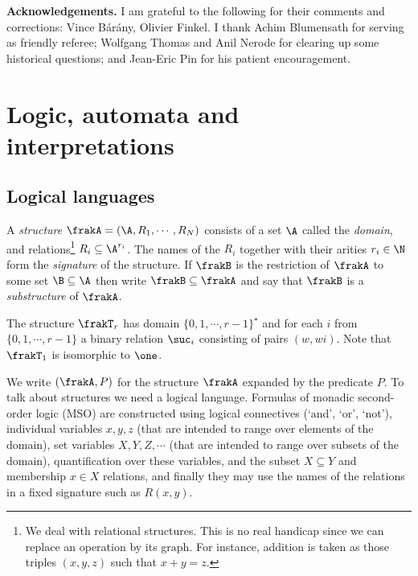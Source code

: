 

{\bf Acknowledgements.} I am grateful to the following for their comments and corrections: Vince B{\'a}r{\'a}ny, Olivier Finkel.  I thank Achim Blumensath for serving as friendly referee; Wolfgang Thomas and Anil Nerode for clearing up some historical questions; and Jean-Eric Pin for his patient encouragement.

\section{Logic, automata and interpretations} \label{AS:sec:back}

 
\subsection{Logical languages}

A \emph{structure}  $\frakA = (\A, R_1, \cdots, R_N)$ consists of a set $\A$ called the {\em domain}, and relations\footnote{We deal with relational structures. This is no real handicap since we can replace an operation by its graph. For instance, addition is taken as those triples $(x,y,z)$ such that $x+y = z$.} $R_i \subseteq \A^{r_i}$. The names of the $R_i$ together with their arities $r_i \in \N$ form the \emph{signature} of the structure. If $\frakB$ is the restriction of $\frakA$ to some set $\B \subseteq \A$ then write $\frakB \subseteq \frakA$ and say that $\frakB$ is a \emph{substructure} of $\frakA$.

\begin{example}
The structure  $\frakT_r$ has domain $\{0,1, \cdots,r-1\}^\star$ and for each  $i$ from $\{0,1, \cdots, r-1\}$ a binary relation $\suc_i$ consisting of pairs $(w,wi)$. 
Note that $\frakT_1$ is isomorphic to $\one$.
\end{example}

We write $(\frakA,P)$ for the structure $\frakA$ expanded by the predicate $P$. %
To talk about structures we need a logical language. Formulas of monadic
second-order logic (MSO) are constructed using logical connectives (`and',
`or', `not'), individual variables $x,y,z$ (that are intended to range over
elements of the domain), set variables $X,Y,Z,\cdots$ (that are intended to
range over subsets of the domain), quantification over these variables, and the
subset $X \subseteq Y$ and membership $x \in X$ relations, and finally they may
use the names of the relations in a fixed signature such as $R(x,y)$.


